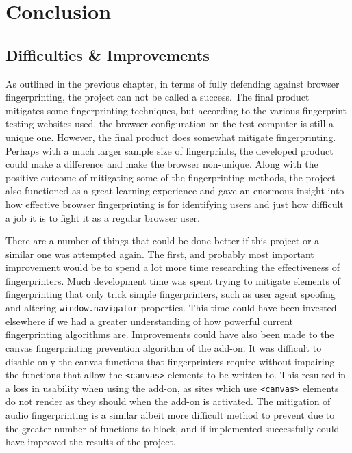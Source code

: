 \chapter{Conclusion}

\section{Difficulties \& Improvements}

As outlined in the previous chapter, in terms of fully defending against browser fingerprinting, the project can not be called a success.
The final product mitigates some fingerprinting techniques, but according to the various fingerprint testing websites used, the browser configuration on the test computer is still a unique one.
However, the final product does somewhat mitigate fingerprinting.
Perhaps with a much larger sample size of fingerprints, the developed product could make a difference and make the browser non-unique.
Along with the positive outcome of mitigating some of the fingerprinting methods, the project also functioned as a great learning experience and gave an enormous insight into how effective browser fingerprinting is for identifying users and just how difficult a job it is to fight it as a regular browser user.

There are a number of things that could be done better if this project or a similar one was attempted again.
The first, and probably most important improvement would be to spend a lot more time researching the effectiveness of fingerprinters.
Much development time was spent trying to mitigate elements of fingerprinting that only trick simple fingerprinters, such as user agent spoofing and altering \texttt{window.navigator} properties.
This time could have been invested elsewhere if we had a greater understanding of how powerful current fingerprinting algorithms are.
Improvements could have also been made to the canvas fingerprinting prevention algorithm of the add-on.
It was difficult to disable only the canvas functions that fingerprinters require without impairing the functions that allow the \texttt{<canvas>} elements to be written to.
This resulted in a loss in usability when using the add-on, as sites which use \texttt{<canvas>} elements do not render as they should when the add-on is activated.
The mitigation of audio fingerprinting is a similar albeit more difficult method to prevent due to the greater number of functions to block, and if implemented successfully could have improved the results of the project.

